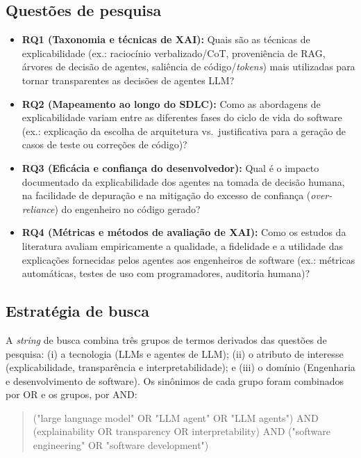 \documentclass[12pt]{article}
\begin{document}
\subsection{Questões de pesquisa}

\begin{itemize}
  \item \textbf{RQ1 (Taxonomia e técnicas de XAI):} Quais são as técnicas de
    explicabilidade (ex.: raciocínio verbalizado/CoT, proveniência de RAG,
    árvores de decisão de agentes, saliência de código/\textit{tokens}) mais
    utilizadas para tornar transparentes as decisões de agentes LLM?
  \item \textbf{RQ2 (Mapeamento ao longo do SDLC):} Como as abordagens de
    explicabilidade variam entre as diferentes fases do ciclo de vida do
    software (ex.: explicação da escolha de arquitetura vs.\ justificativa para
    a geração de casos de teste ou correções de código)?
  \item \textbf{RQ3 (Eficácia e confiança do desenvolvedor):} Qual é o impacto
    documentado da explicabilidade dos agentes na tomada de decisão humana, na
    facilidade de depuração e na mitigação do excesso de confiança
    (\textit{over-reliance}) do engenheiro no código gerado?
  \item \textbf{RQ4 (Métricas e métodos de avaliação de XAI):} Como os estudos
    da literatura avaliam empiricamente a qualidade, a fidelidade e a utilidade
    das explicações fornecidas pelos agentes aos engenheiros de software (ex.:
    métricas automáticas, testes de uso com programadores, auditoria humana)?
\end{itemize}

\subsection{Estratégia de busca}

A \textit{string} de busca combina três grupos de termos derivados das questões
de pesquisa: (i) a tecnologia (LLMs e agentes de LLM); (ii) o atributo de
interesse (explicabilidade, transparência e interpretabilidade); e (iii) o
domínio (Engenharia e desenvolvimento de software). Os sinônimos de cada grupo
foram combinados por OR e os grupos, por AND:

\begin{quote}\small\ttfamily
("large language model" OR "LLM agent" OR "LLM agents") AND
(explainability OR transparency OR interpretability) AND
("software engineering" OR "software development")
\end{quote}
\end{document}
